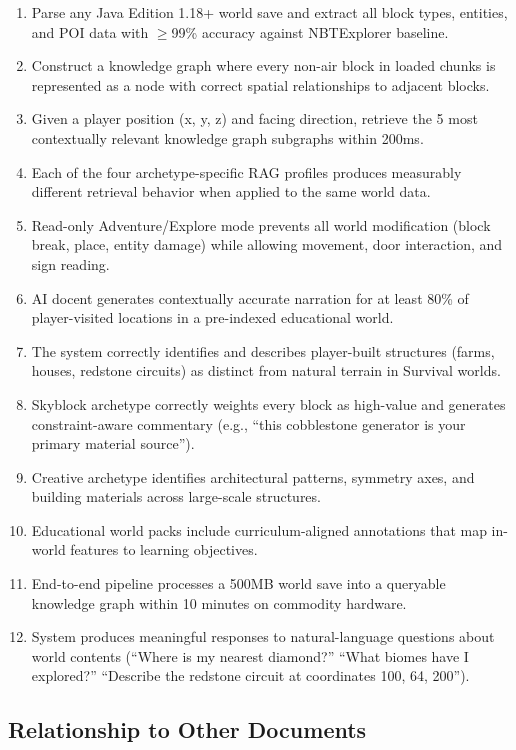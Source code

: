 \documentclass[11pt,letterpaper]{article}
\begin{document}
\begin{enumerate}[leftmargin=2em]
\item Parse any Java Edition 1.18+ world save and extract all block types, entities, and POI data with $\geq$99\% accuracy against NBTExplorer baseline.
\item Construct a knowledge graph where every non-air block in loaded chunks is represented as a node with correct spatial relationships to adjacent blocks.
\item Given a player position (x, y, z) and facing direction, retrieve the 5 most contextually relevant knowledge graph subgraphs within 200ms.
\item Each of the four archetype-specific RAG profiles produces measurably different retrieval behavior when applied to the same world data.
\item Read-only Adventure/Explore mode prevents all world modification (block break, place, entity damage) while allowing movement, door interaction, and sign reading.
\item AI docent generates contextually accurate narration for at least 80\% of player-visited locations in a pre-indexed educational world.
\item The system correctly identifies and describes player-built structures (farms, houses, redstone circuits) as distinct from natural terrain in Survival worlds.
\item Skyblock archetype correctly weights every block as high-value and generates constraint-aware commentary (e.g., ``this cobblestone generator is your primary material source'').
\item Creative archetype identifies architectural patterns, symmetry axes, and building materials across large-scale structures.
\item Educational world packs include curriculum-aligned annotations that map in-world features to learning objectives.
\item End-to-end pipeline processes a 500MB world save into a queryable knowledge graph within 10 minutes on commodity hardware.
\item System produces meaningful responses to natural-language questions about world contents (``Where is my nearest diamond?'' ``What biomes have I explored?'' ``Describe the redstone circuit at coordinates 100, 64, 200'').
\end{enumerate}

\subsection{Relationship to Other Documents}
\end{document}
